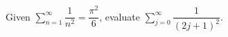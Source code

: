 Given $\sum_{n=1}^{\infty}\dfrac{1}{n^2}=\dfrac{\pi^2}{6}$, evaluate $\sum_{j=0}^{\infty}\dfrac{1}{(2j+1)^2}$.
